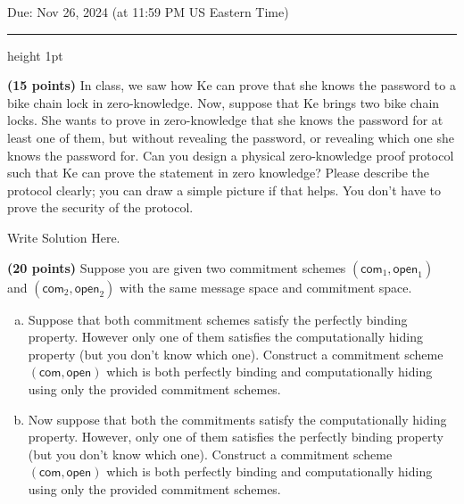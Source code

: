 \documentclass[12pt]{hw}
\begin{document}
\maketitle

\begin{center} Due: Nov 26, 2024 (at 11:59 PM US Eastern Time) \\[10pt]
  \hrule height 1pt
\end{center}

\toggletrue{answers}

\setcounter{MaxMatrixCols}{20} \setlength\parindent{0pt}




\begin{exercise}
{\bf (15 points)}
In class, we saw how 
Ke can prove that she knows the password to a bike chain lock in zero-knowledge.
Now, suppose that Ke brings two bike chain locks. She wants to prove
in zero-knowledge 
that she knows the password for at least one of them, but without
revealing the password, or revealing which one she knows the password for.
Can you design a physical zero-knowledge proof protocol
such that Ke can prove the statement in zero knowledge?
Please describe the protocol clearly; you can draw a simple picture if that helps. 
You don't have to prove the security of the protocol.
\end{exercise}
\begin{answer}
Write Solution Here.
\end{answer}


\begin{exercise}
     {\bf (20 points)} 
     Suppose you are given two commitment schemes $(\mathsf{com}_1, \mathsf{open}_1)$ and $(\mathsf{com}_2, \mathsf{open}_2)$ with the same message space and commitment space.


\begin{enumerate}[(a)]
    \item Suppose that both commitment schemes satisfy the perfectly binding property. However only one of them satisfies the computationally hiding property (but you don't know which one). 
    Construct a commitment scheme $(\mathsf{com}, \mathsf{open})$ which is both perfectly binding and computationally hiding using only the provided commitment schemes.

    \item Now suppose that both the commitments satisfy the computationally hiding property. However, only one of them satisfies the perfectly binding property (but you don't know which one). Construct a commitment scheme $(\mathsf{com}, \mathsf{open})$ which is both perfectly binding and computationally hiding using only the provided commitment schemes. 
\end{enumerate}
\end{exercise}
\end{document}
